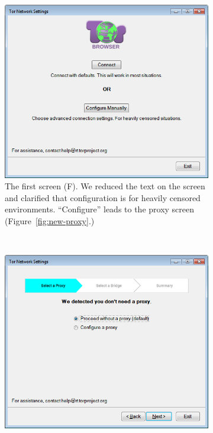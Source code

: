 \documentclass[USenglish,oneside,twocolumn]{article}
\begin{document}
\begin{figure}
\centering
\begin{subfigure}[b]{0.30\textwidth}
	\includegraphics[width=\textwidth]{screenshots/NEW-first.png}
	\centering\captionsetup{width=1.5\linewidth}%
	\caption{The first screen (F). We reduced the text on the screen and clarified that configuration is for heavily censored environments. ``Configure'' leads to the proxy screen  (Figure~\ref{fig:new-proxy}.)}
	\label{fig:new-first}
\end{subfigure}
~~~~~~~~~~~~~~~~~~~~~~~~~
\begin{subfigure}[b]{0.30\textwidth}
	\includegraphics[width=\textwidth]{screenshots/NEW-proxyYES.png}

\end{subfigure}
\end{figure}
\end{document}
